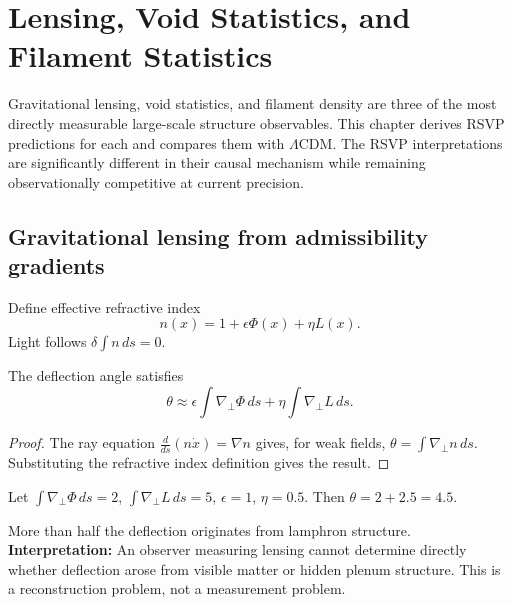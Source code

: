 
\chapter{Lensing, Void Statistics, and Filament Statistics}
\label{ch:cluster-formation}

\begin{WhyChapter}
  Gravitational lensing, void statistics, and filament density
  are three of the most directly measurable large-scale structure
  observables.
  This chapter derives RSVP predictions for each and compares
  them with $\Lambda$CDM.
  The RSVP interpretations are significantly different in their
  causal mechanism while remaining observationally competitive
  at current precision.
\end{WhyChapter}

\section{Gravitational lensing from admissibility gradients}

Define effective refractive index
\[
  n(x) = 1 + \epsilon\Phi(x) + \eta L(x).
\]
Light follows $\delta\int n\,ds = 0$.

\begin{theorem}
  \label{thm:lensing}
  \statusproven{}
  The deflection angle satisfies
  \[
    \theta
    \approx \epsilon\int\nabla_\perp\Phi\,ds
    + \eta\int\nabla_\perp L\,ds.
  \]
\end{theorem}

\begin{proof}
  The ray equation $\frac{d}{ds}(n\dot{x}) = \nabla n$ gives,
  for weak fields,
  $\theta = \int\nabla_\perp n\,ds$.
  Substituting the refractive index definition gives the result.
\end{proof}

\begin{WorkedExample}
  Let $\int\nabla_\perp\Phi\,ds = 2$,
  $\int\nabla_\perp L\,ds = 5$,
  $\epsilon = 1$, $\eta = 0.5$.
  Then $\theta = 2 + 2.5 = 4.5$.

  More than half the deflection originates from lamphron structure.
  \textbf{Interpretation:} An observer measuring lensing cannot
  determine directly whether deflection arose from visible matter
  or hidden plenum structure.
  This is a reconstruction problem, not a measurement problem.
\end{WorkedExample}

